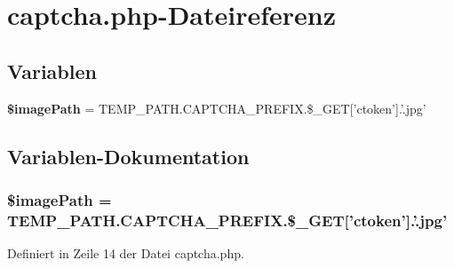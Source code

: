 \section{captcha.php-Dateireferenz}
\label{captcha_8php}
\subsection*{Variablen}
\begin{CompactItemize}
\item 
{\bf \$imagePath} = TEMP\_\-PATH.CAPTCHA\_\-PREFIX.\$\_\-GET['ctoken'].'.jpg'
\end{CompactItemize}


\subsection{Variablen-Dokumentation}
\subsubsection{\setlength{\rightskip}{0pt plus 5cm}\$imagePath = TEMP\_\-PATH.CAPTCHA\_\-PREFIX.\$\_\-GET['ctoken'].'.jpg'}\label{captcha_8php_cbe9353fa1111bcae268c0dc80333131}




Definiert in Zeile 14 der Datei captcha.php.